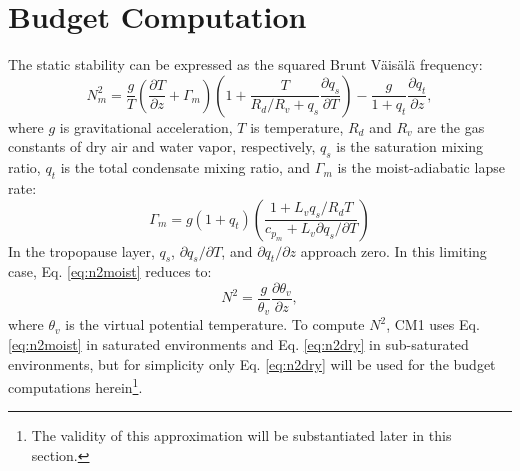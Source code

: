 \documentclass{ametsoc}
\begin{document}
 \section{Budget Computation}

The static stability can be expressed as the squared Brunt V{\"a}is{\"a}l{\"a} frequency:
   \begin{equation} \label{eq:n2moist}
   N_m^2 = \frac{g}{T}\left(\frac{\partial T}{\partial z}+\Gamma_m\right)\left(1+\frac{T}{R_d/R_v+q_s}\frac{\partial q_s}{\partial T}\right)-\frac{g}{1+q_t}\frac{\partial q_t}{\partial z},
   \end{equation}
where $g$ is gravitational acceleration, $T$ is temperature, $R_d$ and $R_v$ are the gas constants of dry air and water vapor, respectively, $q_s$ is the saturation mixing ratio, $q_t$ is the total condensate mixing ratio, and $\Gamma_m$ is the moist-adiabatic lapse rate:
   \begin{equation} \label{eq:gamma_m}
   \Gamma_m = g(1+q_t)\left(\frac{1+L_vq_s/R_dT}{c_p_m +L_v\partial q_s/\partial T}\right)
   \end {equation}
In the tropopause layer, $q_s$, ${\partial q_s}/{\partial T}$, and ${\partial q_t}/{\partial z}$ approach zero. In this limiting case, Eq. \ref{eq:n2moist} reduces to:
   \begin{equation} \label{eq:n2dry}
   N^2 = \frac{g}{\theta_v}\frac{\partial \theta_v}{\partial z},
   \end{equation}
where $\theta_v$ is the virtual potential temperature.
To compute $N^2$, CM1 uses Eq. \ref{eq:n2moist} in saturated environments and Eq. \ref{eq:n2dry} in sub-saturated environments, but for simplicity only Eq. \ref{eq:n2dry} will be used for the budget computations herein\footnote{The validity of this approximation will be substantiated later in this section.}.
\end{document}
